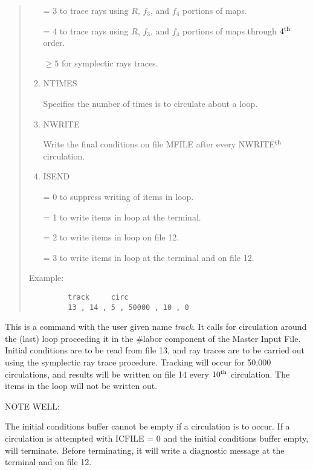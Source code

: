 \begin{quotation}
\begin{enumerate}
             = 3 to trace rays using $R$, $f_3$, and $f_4$  portions of maps.

             = 4 to trace rays using $R$, $f_3$, and $f_4$  portions of maps
               through $4^{\mbox{\scriptsize th}}$ order.

             $\geq 5$ for symplectic rays traces.

      \item  NTIMES

             Specifies the number of times \Mary is to circulate about a loop.

      \item  NWRITE

             Write the final conditions on file MFILE after every
NWRITE$^{{\rm th}}$
             circulation.

      \item  ISEND

             = 0 to suppress writing of items in loop.

             = 1 to write items in loop at the terminal.

             = 2 to write items in loop on file 12.

             = 3 to write items in loop at the terminal and on file 12.
\end{enumerate}

\vspace{5mm}
\noindent     Example:
\begin{verbatim}
         track     circ
         13 , 14 , 5 , 50000 , 10 , 0
\end{verbatim}
\end{quotation}
This is a command with the user given name {\em track}.  It calls for circulation
around the (last) loop proceeding it in the \#labor component of the
Master Input File.  Initial conditions are to be read from file 13, and ray
traces are to be carried out using the symplectic ray trace procedure.
Tracking will occur for 50,000 circulations, and results will be written on
file 14 every $10^{\mbox{\scriptsize th}}$ circulation.  The items in the loop will not be written
out.

\vspace{5mm}
     NOTE WELL:
\vspace{2mm}

     The initial conditions buffer cannot be empty if a circulation is
to occur.  If a circulation is attempted with ICFILE = 0 and the initial
conditions buffer empty, \Mary will terminate.  Before terminating, it
will write a diagnostic message at the terminal and on file 12.

